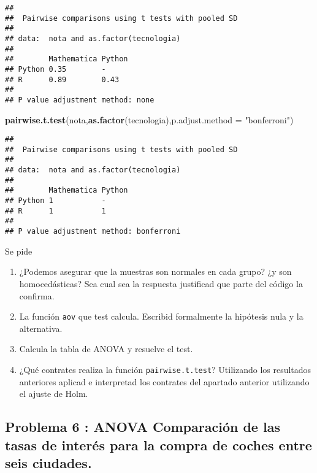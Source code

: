 \documentclass[
]{article}
\newenvironment{Shaded}{\begin{snugshade}}{\end{snugshade}}
\newcommand{\DataTypeTok}[1]{\textcolor[rgb]{0.13,0.29,0.53}{#1}}
\newcommand{\KeywordTok}[1]{\textcolor[rgb]{0.13,0.29,0.53}{\textbf{#1}}}
\newcommand{\NormalTok}[1]{#1}
\newcommand{\StringTok}[1]{\textcolor[rgb]{0.31,0.60,0.02}{#1}}
\providecommand{\tightlist}{%
  \setlength{\itemsep}{0pt}\setlength{\parskip}{0pt}}
\begin{document}
\begin{verbatim}
## 
##  Pairwise comparisons using t tests with pooled SD 
## 
## data:  nota and as.factor(tecnologia) 
## 
##        Mathematica Python
## Python 0.35        -     
## R      0.89        0.43  
## 
## P value adjustment method: none
\end{verbatim}

\begin{Shaded}
\begin{Highlighting}[]
\KeywordTok{pairwise.t.test}\NormalTok{(nota,}\KeywordTok{as.factor}\NormalTok{(tecnologia),}\DataTypeTok{p.adjust.method =} \StringTok{"bonferroni"}\NormalTok{)}
\end{Highlighting}
\end{Shaded}

\begin{verbatim}
## 
##  Pairwise comparisons using t tests with pooled SD 
## 
## data:  nota and as.factor(tecnologia) 
## 
##        Mathematica Python
## Python 1           -     
## R      1           1     
## 
## P value adjustment method: bonferroni
\end{verbatim}

Se pide

\begin{enumerate}
\def\labelenumi{\arabic{enumi}.}
\tightlist
\item
  ¿Podemos asegurar que la muestras son normales en cada grupo? ¿y son
  homocedásticas? Sea cual sea la respuesta justificad que parte del
  código la confirma.
\item
  La función \texttt{aov} que test calcula. Escribid formalmente la
  hipótesis nula y la alternativa.
\item
  Calcula la tabla de ANOVA y resuelve el test.
\item
  ¿Qué contrates realiza la función \texttt{pairwise.t.test}? Utilizando
  los resultados anteriores aplicad e interpretad los contrates del
  apartado anterior utilizando el ajuste de Holm.
\end{enumerate}

\hypertarget{problema-6-anova-comparaciuxf3n-de-las-tasas-de-interuxe9s-para-la-compra-de-coches-entre-seis-ciudades.}{%
\subsection{Problema 6 : ANOVA Comparación de las tasas de interés para
la compra de coches entre seis
ciudades.}\label{problema-6-anova-comparaciuxf3n-de-las-tasas-de-interuxe9s-para-la-compra-de-coches-entre-seis-ciudades.}}
\end{document}
